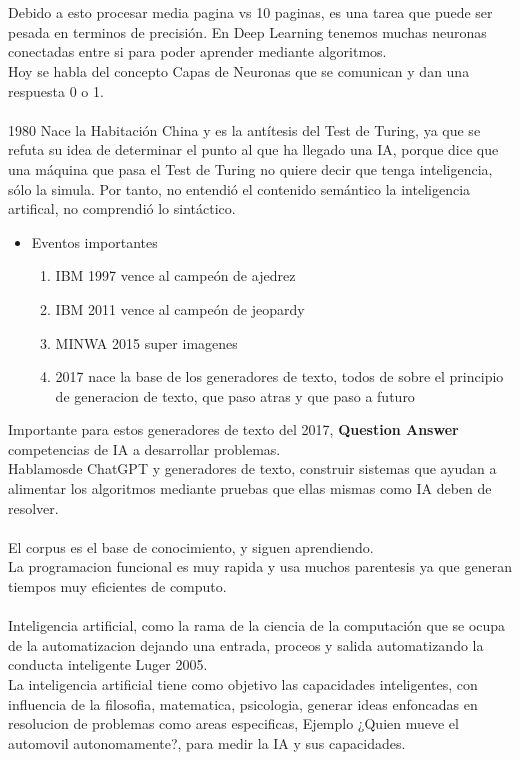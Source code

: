 \documentclass[a4paper]{report} %
\begin{document}
            \\\\Debido a esto procesar media pagina vs 10 paginas, es una tarea que puede ser pesada en terminos de precisión. En Deep Learning tenemos muchas neuronas conectadas entre si para poder aprender mediante algoritmos.
            \\Hoy se habla del concepto Capas de Neuronas que se comunican y dan una respuesta 0 o 1.
            \\\\1980 Nace la Habitación China y es la antítesis del Test de Turing, ya que se refuta su idea de determinar el punto al que ha llegado una IA, porque dice que una máquina que pasa el Test de Turing no quiere decir que tenga inteligencia, sólo la simula. Por tanto, no entendió el contenido semántico la inteligencia artifical, no comprendió lo sintáctico.
            \begin{itemize}
              \item Eventos importantes
                \begin{enumerate}
                  \item IBM 1997 vence al campeón de ajedrez
                  \item IBM 2011 vence al campeón de jeopardy
                  \item MINWA 2015 super imagenes
                  \item 2017 nace la base de los generadores de texto, todos de sobre el principio de generacion de texto, que paso atras y que paso a futuro
              \end{enumerate}
            \end{itemize}
            Importante para estos generadores de texto del 2017, \textbf{Question Answer} competencias de IA a desarrollar problemas.
            \\Hablamosde ChatGPT y generadores de texto, construir sistemas que ayudan a alimentar los algoritmos mediante pruebas que ellas mismas como IA deben de resolver.
            \\\\El corpus es el base de conocimiento, y siguen aprendiendo.
            \\La programacion funcional es muy rapida y usa muchos parentesis ya que generan tiempos muy eficientes de computo.
            \\\\Inteligencia artificial, como la rama de la ciencia de la computación que se ocupa de la automatizacion dejando una entrada, proceos y salida automatizando la conducta inteligente Luger 2005.
            \\La inteligencia artificial tiene como objetivo las capacidades inteligentes, con influencia de la filosofia, matematica, psicologia, generar ideas enfoncadas en resolucion de problemas como areas especificas, Ejemplo ¿Quien mueve el automovil autonomamente?, para medir la IA y sus capacidades.
\end{document}
